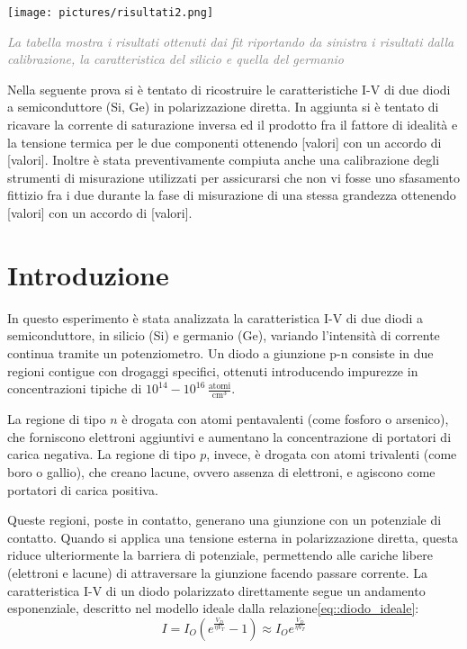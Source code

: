 \documentclass[a4paper,11pt]{article}
\begin{document}
\begin{table}[h!]
	\centering
  \texttt{[image: pictures/risultati2.png]}	\caption{\textit{\textcolor{gray}{La tabella mostra i risultati ottenuti dai fit riportando da sinistra i risultati dalla calibrazione, la caratteristica del silicio e quella del germanio}}}
    \label{tab::risultati}
\end{table}


Nella seguente prova si è tentato di ricostruire le caratteristiche I-V di due diodi a semiconduttore (Si, Ge) in polarizzazione diretta. In aggiunta si è tentato di ricavare la corrente di saturazione inversa ed il prodotto fra il fattore di idealità e la tensione termica per le due componenti ottenendo [valori] con un accordo di [valori]. Inoltre è stata preventivamente compiuta anche una calibrazione degli strumenti di misurazione utilizzati per assicurarsi che non vi fosse uno sfasamento fittizio fra i due durante la fase di misurazione di una stessa grandezza ottenendo [valori] con un accordo di [valori].

\section*{Introduzione}
In questo esperimento è stata analizzata la caratteristica I-V di due diodi a semiconduttore, in silicio (Si) e germanio (Ge), variando l’intensità di corrente continua tramite un potenziometro. Un diodo a giunzione p-n consiste in due regioni contigue con drogaggi specifici, ottenuti introducendo impurezze in concentrazioni tipiche di $10^{14} - 10^{16} \, \mathrm{\frac{atomi}{cm^3}}$. 

La regione di tipo $n$ è drogata con atomi pentavalenti (come fosforo o arsenico), che forniscono elettroni aggiuntivi e aumentano la concentrazione di portatori di carica negativa. La regione di tipo $p$, invece, è drogata con atomi trivalenti (come boro o gallio), che creano lacune, ovvero assenza di elettroni, e agiscono come portatori di carica positiva.

Queste regioni, poste in contatto, generano una giunzione con un potenziale di contatto. Quando si applica una tensione esterna in polarizzazione diretta, questa riduce ulteriormente la barriera di potenziale, permettendo alle cariche libere (elettroni e lacune) di attraversare la giunzione facendo passare corrente. La caratteristica I-V di un diodo polarizzato direttamente segue un andamento esponenziale, descritto nel modello ideale dalla relazione\eqref{eq::diodo_ideale}:
\begin{equation}
\label{eq::diodo_ideale}
I=I_O(e^{\frac{V_D}{\eta V_T}}-1) \approx  I_O e^{\frac{V_D}{\eta V_T}}
\end{equation}
\end{document}
